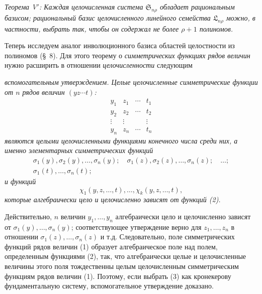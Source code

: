 \documentclass[11pt]{article}
\providecommand{\Ssys}{\mathfrak{S}}
\providecommand{\Lsys}{\mathfrak{L}}
\begin{document}
\emph{Теорема V$'$: Каждая целочисленная система $\Ssys_{n\rho}$ обладает рациональным базисом; рациональный базис целочисленного линейного семейства $\Lsys_{n\rho}$ можно, в частности, выбрать так, чтобы он содержал не более $\rho+1$ полиномов.}

Теперь исследуем аналог инволюционного базиса областей целостности из полиномов (\S\ 8). Для этого теорему о \emph{симметрических функциях рядов величин} нужно расширить в отношении \emph{целочисленности} следующим

\emph{вспомогательным утверждением. Целые целочисленные симметрические функции от $n$ рядов величин $(yz\cdots t)$:}
\begin{equation}
\begin{array}{cccc}
  y_1&z_1&\cdots&t_1\\
  y_2&z_2&\cdots&t_2\\
  \vdots&\vdots&&\vdots\\
  y_n&z_n&\cdots&t_n
\end{array}
\tag{1}
\end{equation}
\emph{являются целыми целочисленными функциями конечного числа среди них, а именно элементарных симметрических функций}
\begin{equation}
\begin{gathered}
  \sigma_1(y),\sigma_2(y),\ldots,\sigma_n(y);\quad
  \sigma_1(z),\sigma_2(z),\ldots,\sigma_n(z);\quad\ldots;\\
  \sigma_1(t),\ldots,\sigma_n(t);
\end{gathered}
\tag{2}
\end{equation}
\emph{и функций}
\begin{equation}
  \chi_1(y,z,\ldots,t),\ldots,\chi_k(y,z,\ldots,t),
\tag{3}
\end{equation}
\emph{которые алгебраически цело и целочисленно зависят от функций (2).}

Действительно, $n$ величин $y_1,\ldots,y_n$ алгебраически цело и целочисленно зависят от $\sigma_1(y),\ldots,\sigma_n(y)$; соответствующее утверждение верно для $z_1,\ldots,z_n$ в отношении $\sigma_1(z),\ldots,\sigma_n(z)$ и т.д. Следовательно, поле симметрических функций рядов величин (1) образует алгебраическое поле над полем, определенным функциями (2), так, что алгебраически целые и целочисленные величины этого поля тождественны целым целочисленным симметрическим функциям рядов величин (1). Поэтому, если выбрать (3) как кронекерову фундаментальную систему, вспомогательное утверждение доказано.
\end{document}
